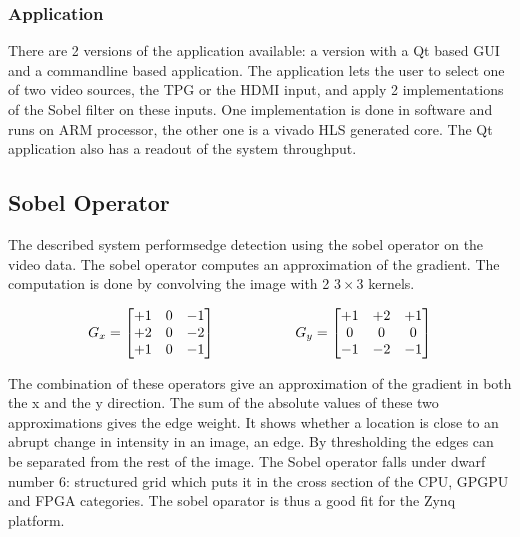 \subsubsection{Application}
There are 2 versions of the application available: a version with a Qt based GUI and a commandline based application. The application lets the user to select one of two video sources, the TPG or the HDMI input, and apply 2 implementations of the Sobel filter on these inputs. One implementation is done in software and runs on ARM processor, the other one is a vivado HLS generated core. The Qt application also has a readout of the system throughput.


\subsection{Sobel Operator}

The described system performsedge detection using the sobel operator on the video data. The sobel operator computes an approximation of the gradient. The computation is done by convolving the image with 2 $3 \times 3$ kernels.

\begin{equation}
G_{x} = 
\begin{bmatrix}
+1 & 0 & -1 \\
+2 & 0 & -2 \\
+1 & 0 & -1
\end{bmatrix}
\hspace{20mm}
G_{y} = 
\begin{bmatrix}
+1 & +2 & +1 \\
0 & 0 & 0 \\
-1 & -2 & -1 \\
\end{bmatrix}
\end{equation}

The combination of these operators give an approximation of the gradient in both the x and the y direction. The sum of the absolute values of these two approximations gives the edge weight. It shows whether a location is close to an abrupt change in intensity in an image, an edge. By thresholding the edges can be separated from the rest of the image. The Sobel operator falls under dwarf number 6: structured grid which puts it in the cross section of the CPU, GPGPU and FPGA categories. The sobel oparator is thus a good fit for the Zynq platform. 